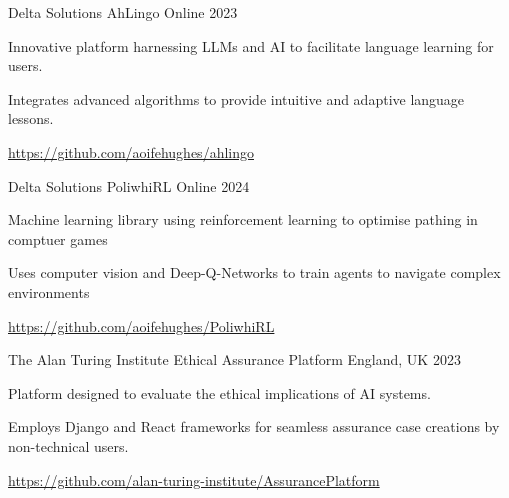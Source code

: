 
\begin{cventries}

  \cventry
    {Delta Solutions} %
    {AhLingo} %
    {Online} %
    {2023} %
    {
      \begin{cvitems}
        \item {Innovative platform harnessing LLMs and AI to facilitate language learning for users.}
        \item {Integrates advanced algorithms to provide intuitive and adaptive language lessons.}
        \item {\url{https://github.com/aoifehughes/ahlingo}}
      \end{cvitems}
    }

    \cventry
    {Delta Solutions} %
    {PoliwhiRL} %
    {Online} %
    {2024} %
    {
      \begin{cvitems}
        \item {Machine learning library using reinforcement learning to optimise
        pathing in comptuer games}
        \item {Uses computer vision and Deep-Q-Networks to train agents to navigate complex environments}
        \item {\url{https://github.com/aoifehughes/PoliwhiRL}}
      \end{cvitems}
    }

  \cventry
    {The Alan Turing Institute} %
    {Ethical Assurance Platform} %
    {England, UK} %
    {2023} %
    {
      \begin{cvitems}
        \item {Platform designed to evaluate the ethical implications of AI systems.}
        \item {Employs Django and React frameworks for seamless assurance case creations by non-technical users.}
        \item {\url{https://github.com/alan-turing-institute/AssurancePlatform}}
      \end{cvitems}
    }


\end{cventries}

